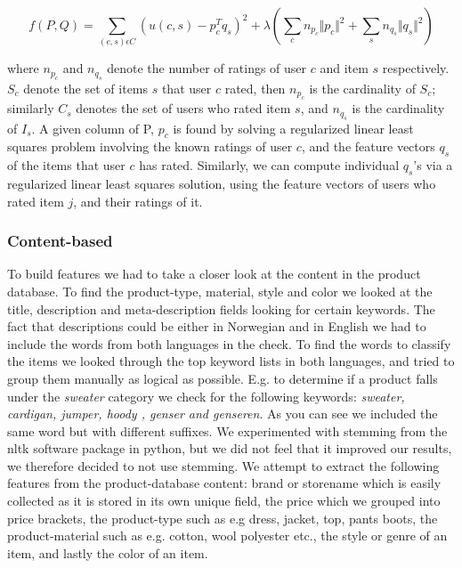 \begin{equation}
f(P, Q) = \sum_{(c,s)\epsilon C} (u(c,s) - p^{T}_{c}q_{s})^{2} + \lambda (\sum_{c} n_{p_{c}} \Vert p_{c} \Vert ^{2} + \sum_{s} n_{q_{s}} \Vert q_{s} \Vert ^{2})
\label{WeightedLamba}
\end{equation}

where $n_{p_{c}}$ and $n_{q_{s}}$ denote the number of ratings of user $c$ and item $s$ respectively. $S_{c}$ denote the set of items $s$ that user $c$ rated, then $n_{p_{c}}$ is the cardinality of $S_{c}$; similarly $C_{s}$ denotes the set of users who rated item $s$, and $n_{q_{s}}$ is the cardinality of $I_{s}$. A given column of P, $p_{c}$ is found by solving a regularized linear least squares problem involving the known ratings of user $c$, and the feature vectors $q_{s}$ of the items that user $c$ has rated. Similarly, we can compute individual $q_{s}$'s via a regularized linear least squares solution, using the feature vectors of users who rated item $j$, and their ratings of it.

\subsubsection{Content-based}

To build features we had to take a closer look at the content in the product database. To find the product-type, material, style and color we looked at the title, description and meta-description fields looking for certain keywords. The fact that descriptions could be either in Norwegian and in English we had to include the words from both languages in the check. To find the words to classify the items we looked through the top keyword lists in both languages, and tried to group them manually as logical as possible. E.g. to determine if a product falls under the \emph{sweater} category we check for the following keywords: \emph{sweater, cardigan, jumper, hoody , genser and genseren}. As you can see we included the same word but with different suffixes. We experimented with stemming from the nltk software package in python, but we did not feel that it improved
our results, we therefore decided to not use stemming. We attempt to extract the following features from the product-database content: brand or storename which is easily collected as it is stored in its own unique field, the price which we grouped into price brackets, the product-type such as e.g dress, jacket, top, pants boots, the product-material such as e.g. cotton, wool polyester etc., the style or genre of an item, and lastly the color of an item. 

